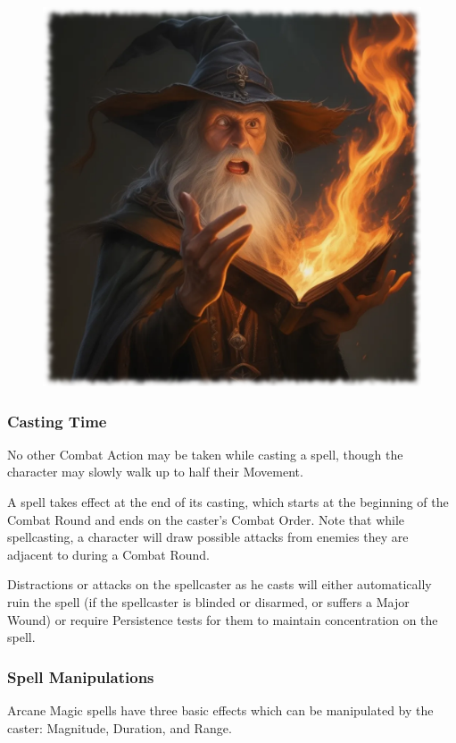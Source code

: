 \vspace{1em}

\begin{figure}[h]
\begin{center}
  \includegraphics[scale=0.23]{img/ai-images/spell-fumble.png}
\end{center}
\end{figure}

\subsubsection{Casting Time}
No other Combat Action may be taken while casting a spell, though the character may slowly walk up to half their Movement. 

A spell takes effect at the end of its casting, which starts at the beginning of the Combat Round and ends on the caster's Combat Order. Note that while spellcasting, a character will draw possible attacks from enemies they are adjacent to during a Combat Round. 

Distractions or attacks on the spellcaster as he casts will either automatically ruin the spell (if the spellcaster is blinded or disarmed, or suffers a Major Wound) or require Persistence tests for them to maintain concentration on the spell. 

\subsubsection{Spell Manipulations}
Arcane Magic spells have three basic effects which can be manipulated by the caster: Magnitude, Duration, and Range.

